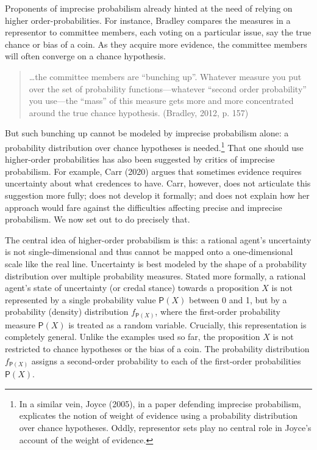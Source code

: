 \documentclass[
  letterpaper,
  DIV=11,
  numbers=noendperiod]{scrartcl}
\begin{document}
Proponents of imprecise probabilism already hinted at the need of
relying on higher order-probabilities. For instance, Bradley compares
the measures in a representor to committee members, each voting on a
particular issue, say the true chance or bias of a coin. As they acquire
more evidence, the committee members will often converge on a chance
hypothesis.

\begin{quote}
\dots the committee members are ``bunching up''. Whatever measure you
put over the set of probability functions---whatever ``second order
probability'' you use---the ``mass'' of this measure gets more and more
concentrated around the true chance hypothesis. (Bradley, 2012, p. 157)
\end{quote}

\noindent But such bunching up cannot be modeled by imprecise
probabilism alone: a probability distribution over chance hypotheses is
needed.\footnote{In a similar vein, Joyce (2005), in a paper defending
  imprecise probabilism, explicates the notion of weight of evidence
  using a probability distribution over chance hypotheses. Oddly,
  representor sets play no central role in Joyce's account of the weight
  of evidence.} That one should use higher-order probabilities has also
been suggested by critics of imprecise probabilism. For example, Carr
(2020) argues that sometimes evidence requires uncertainty about what
credences to have. Carr, however, does not articulate this suggestion
more fully; does not develop it formally; and does not explain how her
approach would fare against the difficulties affecting precise and
imprecise probabilism. We now set out to do precisely that.

The central idea of higher-order probabilism is this: a rational agent's
uncertainty is not single-dimensional and thus cannot be mapped onto a
one-dimensional scale like the real line. Uncertainty is best modeled by
the shape of a probability distribution over multiple probability
measures. Stated more formally, a rational agent's state of uncertainty
(or credal stance) towards a proposition \(X\) is not represented by a
single probability value \(\mathsf{P}(X)\) between 0 and 1, but by a
probability (density) distribution \(f_{\mathsf{P}(X)}\), where the
first-order probability measure \(\mathsf{P}(X)\) is treated as a random
variable. Crucially, this representation is completely general. Unlike
the examples used so far, the proposition \(X\) is not restricted to
chance hypotheses or the bias of a coin. The probability distribution
\(f_{\mathsf{P}(X)}\) assigns a second-order probability to each of the
first-order probabilities \(\mathsf{P}(X)\).
\end{document}
